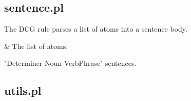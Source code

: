 \subsection{sentence.pl}

\label{sec:sentence}

\begin{description}
The  DCG rule parses a list of atoms into a sentence body.

\begin{arguments}
 & The list of atoms.

"Determiner Noun VerbPhrase" sentences. \\
\end{arguments}
\end{description}

\subsection{utils.pl}

\label{sec:utils}

